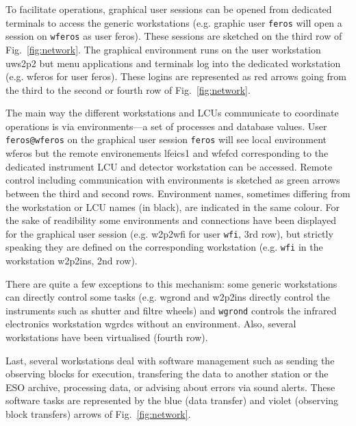 \documentclass[11pt,fleqn,a4paper]{book}
\begin{document}
To facilitate operations, graphical user sessions can be opened from dedicated terminals to access the generic workstations (e.g. graphic user \texttt{feros} will open a session on \texttt{wferos} as user feros).  These sessions are sketched on the third row of Fig.~\ref{fig:network}.  The graphical environment runs on the user workstation \gls{uws2p2} but menu applications and terminals log into the dedicated workstation (e.g. \gls{wferos} for user \gls{feros}). These logins are represented as red arrows going from the third to the second or fourth row of Fig.~\ref{fig:network}.

The main way the different workstations and LCUs communicate to coordinate operations is via \glspl{environment}---a set of processes and database values.  User \texttt{feros@wferos} on the graphical user session \texttt{feros} will see local environment \gls{wferos} but the remote environements \gls{lfeics1} and \gls{wfefcd} corresponding to the dedicated instrument LCU and detector workstation can be accessed.  Remote control including communication with environments is sketched as green arrows between the third and second rows. Environment names, sometimes differing from the workstation or LCU names (in black), are indicated in the same colour.  For the sake of readibility some environments and connections have been displayed for the graphical user session (e.g. \gls{w2p2wfi} for user \texttt{wfi}, 3rd row), but strictly speaking they are defined on the corresponding workstation (e.g. \texttt{wfi} in the workstation \gls{w2p2ins}, 2nd row).

There are quite a few exceptions to this mechanism: some generic workstations can directly control some tasks (e.g. \gls{wgrond} and \gls{w2p2ins} directly control the instruments such as shutter and filtre wheels) and \texttt{wgrond} controls the infrared electronics workstation \gls{wgrdcs} without an environment. Also, several workstations have been virtualised (fourth row).

Last, several workstations deal with software management such as sending the observing blocks for execution, transfering the data to another station or the ESO archive, processing data, or advising about errors via sound alerts.  These software tasks are represented by the blue (data transfer) and violet (observing block transfers) arrows of Fig.~\ref{fig:network}.  
\end{document}

